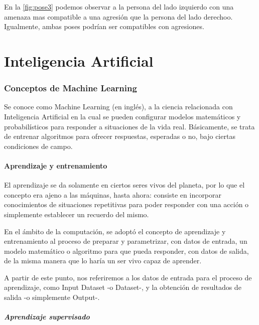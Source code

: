 \documentclass[a4paper,12pt,twoside]{article}
\begin{document}
En la \ref{fig:pose3} podemos observar a la persona del lado izquierdo con una amenaza mas compatible a una agresión que la persona del lado derechoo. Igualmente, ambas poses podrían ser compatibles con agresiones.\par

	
\newpage	
\part{Inteligencia Artificial}

\section{Conceptos de Machine Learning}

Se conoce como Machine Learning (en inglés), a la ciencia relacionada con Inteligencia Artificial en la cual se pueden configurar modelos matemáticos y probabilísticos para responder a situaciones de la vida real. Básicamente, se trata de entrenar algoritmos para ofrecer respuestas, esperadas o no, bajo ciertas condiciones de campo.\par
	
\subsection{Aprendizaje y entrenamiento}
El aprendizaje se da solamente en ciertos seres vivos del planeta, por lo que el concepto era ajeno a las máquinas, hasta ahora: consiste en incorporar conocimientos de situaciones repetitivas para poder responder con una acción o simplemente establecer un recuerdo del mismo.\par

En el ámbito de la computación, se adoptó el concepto de aprendizaje y entrenamiento al proceso de preparar y parametrizar, con datos de entrada, un modelo matemático o algoritmo para que pueda responder, con datos de salida, de la misma manera que lo haría un ser vivo capaz de aprender.\par

A partir de este punto, nos referiremos a los datos de entrada para el proceso de aprendizaje, como Input Dataset -o Dataset-, y la obtención de resultados de salida -o simplemente Output-.

\subsubsection{Aprendizaje supervisado}
\end{document}
